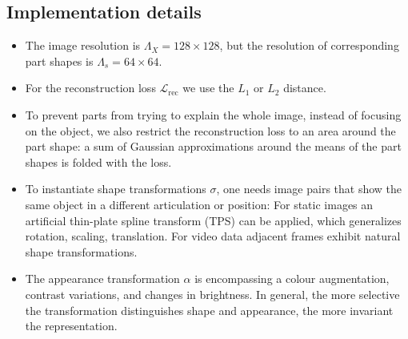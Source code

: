 \subsection{Implementation details}\label{implementationdetails}
\begin{itemize}
\item The image resolution is $\Lambda_X = 128 \times 128$, but the resolution of corresponding part shapes is $\Lambda_s = 64 \times 64$.
\item For the reconstruction  loss $\mathcal{L}_\text{rec}$ we use the $L_1$ or $L_2$ distance.
\item  To prevent parts from trying to explain the whole image, instead of focusing on the object, we also restrict the reconstruction loss to an area around the part shape: a sum of Gaussian approximations around the means of the part shapes is folded with the loss.
\item To instantiate shape transformations $\sigma$, one needs image pairs that show the same object in a different articulation or position: For static images an artificial thin-plate spline transform (TPS) can be applied, which generalizes rotation, scaling, translation. For video data adjacent frames exhibit natural shape transformations.
\item The appearance transformation $\alpha$ is encompassing a colour augmentation, contrast variations, and changes in brightness. In general, the more selective the transformation distinguishes shape and appearance, the more invariant the representation.

\end{itemize}

